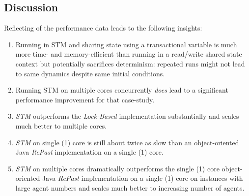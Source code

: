 \subsection{Discussion}
Reflecting of the performance data leads to the following insights:
\begin{enumerate}
	\item Running in STM and sharing state using a transactional variable is much more time- and memory-efficient than running in a read/write shared state context but potentially sacrifices determinism: repeated runs might not lead to same dynamics despite same initial conditions.
	\item Running STM on multiple cores concurrently \textit{does} lead to a significant performance improvement for that case-study.
	\item \textit{STM} outperforms the \textit{Lock-Based} implementation substantially and scales much better to multiple cores.
	\item \textit{STM} on single (1) core is still about twice as slow than an object-oriented Java \textit{RePast} implementation on a single (1) core.
	\item \textit{STM} on multiple cores dramatically outperforms the single (1) core object-oriented Java \textit{RePast} implementation on a single (1) core on instances with large agent numbers and scales much better to increasing number of agents.
\end{enumerate}